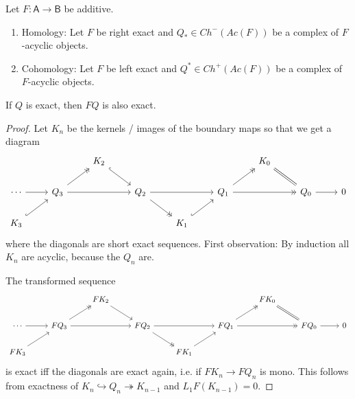 \documentclass[fontsize=11pt,fleqn,a4paper]{scrartcl}
\begin{document}
\begin{lemma}
Let $F:\mathsf{A}\to\mathsf{B}$ be additive.
\begin{multicols}{2}
\begin{enumerate}
\item Homology: Let $F$ be right exact and $Q_\ast\in Ch^-(Ac(F))$ be a complex of $F$-acyclic objects.
\item Cohomology: Let $F$ be left exact and $Q^\ast\in Ch^+(Ac(F))$ be a complex of $F$-acyclic objects.
\end{enumerate}
\end{multicols}
If $Q$ is exact, then $FQ$ is also exact.
\end{lemma}
\begin{proof}
Let $K_n$ be the kernels / images of the boundary maps so that we get a diagram
\[\begin{tikzcd}
&& K_2 \ar[rd,hook] && && K_0 \ar[rd,equal] && \\
\cdots \ar[r] & Q_3 \ar[ru,->>] \ar[rr] && Q_2 \ar[dr,->>] \ar[rr] && Q_1 \ar[rr,->>] \ar[ru,->>]  && Q_0 \ar[r] & 0 \\
K_3 \ar[ru,hook] && && K_1 \ar[ru,hook] && &&
\end{tikzcd}\]
where the diagonals are short exact sequences. First observation: By induction all $K_n$ are acyclic, because the $Q_n$ are.

The transformed sequence
\[\begin{tikzcd}
&& FK_2 \ar[rd] && && FK_0 \ar[rd,equal] && \\
\cdots \ar[r] & FQ_3 \ar[ru,->>] \ar[rr] && FQ_2 \ar[dr,->>] \ar[rr] && FQ_1 \ar[rr,->>] \ar[ru,->>] && FQ_0 \ar[r] & 0 \\
FK_3 \ar[ru] && && FK_1 \ar[ru] && &&
\end{tikzcd}\]
is exact iff the diagonals are exact again, i.e. if $FK_n \to FQ_n$ is mono. This follows from exactness of $K_n \hookrightarrow Q_n \twoheadrightarrow K_{n-1}$ and $L_1F(K_{n-1})=0$.
\end{proof}
\end{document}
